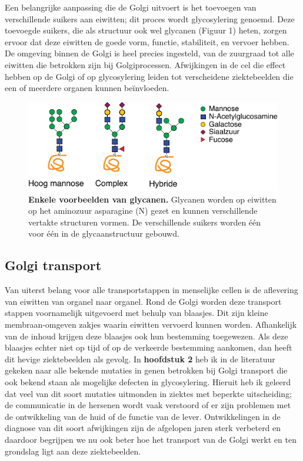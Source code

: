Een belangrijke aanpassing die de Golgi uitvoert is het toevoegen van verschillende suikers aan eiwitten; dit proces wordt glycosylering genoemd\cite{moremen_vertebrate_2012}. Deze toevoegde suikers, die als structuur ook wel glycanen (Figuur 1) heten, zorgen ervoor dat deze eiwitten de goede vorm, functie, stabiliteit, en vervoer hebben. De omgeving binnen de Golgi is heel precies ingesteld, van de zuurgraad tot alle eiwitten die betrokken zijn bij Golgiprocessen. Afwijkingen in de cel die effect hebben op de Golgi of op glycosylering leiden tot verscheidene ziektebeelden die een of meerdere organen kunnen beïnvloeden.

\begin{figure}
    \includegraphics[keepaspectratio=true,width=\textwidth,height=\textheight]{chapters/chapter8/chapter8_Figure1_nl.pdf}
    \caption{\textbf{Enkele voorbeelden van glycanen.} Glycanen worden op eiwitten op het aminozuur asparagine (N) gezet en kunnen verschillende vertakte structuren vormen. De verschillende suikers worden één voor één in de glycaanstructuur gebouwd.}
    \label{fig:ch8fig1nl}
\end{figure}

\subsection{Golgi transport}

Van uiterst belang voor alle transportstappen in menselijke cellen is de aflevering van eiwitten van organel naar organel. Rond de Golgi worden deze transport stappen voornamelijk uitgevoerd met behulp van blaasjes. Dit zijn kleine membraan-omgeven zakjes waarin eiwitten vervoerd kunnen worden. Afhankelijk van de inhoud krijgen deze blaasjes ook hun bestemming toegewezen. Als deze blaasjes echter niet op tijd of op de verkeerde bestemming aankomen, dan heeft dit hevige ziektebeelden als gevolg. In \textbf{hoofdstuk 2} heb ik in de literatuur gekeken naar alle bekende mutaties in genen betrokken bij Golgi transport die ook bekend staan als mogelijke defecten in glycosylering. Hieruit heb ik geleerd dat veel van dit soort mutaties uitmonden in ziektes met beperkte uitscheiding; de communicatie in de hersenen wordt vaak verstoord of er zijn problemen met de ontwikkeling van de huid of de functie van de lever. Ontwikkelingen in de diagnose van dit soort afwijkingen zijn de afgelopen jaren sterk verbeterd en daardoor begrijpen we nu ook beter hoe het transport van de Golgi werkt en ten grondslag ligt aan deze ziektebeelden.

